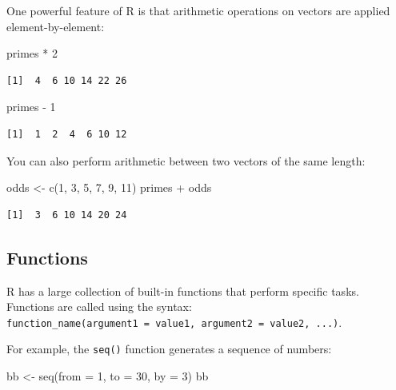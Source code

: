 \documentclass[
  letterpaper,
  DIV=11,
  numbers=noendperiod]{scrreprt}
\newenvironment{Shaded}{\begin{snugshade}}{\end{snugshade}}
\newcommand{\AttributeTok}[1]{\textcolor[rgb]{0.40,0.45,0.13}{#1}}
\newcommand{\DecValTok}[1]{\textcolor[rgb]{0.68,0.00,0.00}{#1}}
\newcommand{\FunctionTok}[1]{\textcolor[rgb]{0.28,0.35,0.67}{#1}}
\newcommand{\NormalTok}[1]{\textcolor[rgb]{0.00,0.23,0.31}{#1}}
\newcommand{\OtherTok}[1]{\textcolor[rgb]{0.00,0.23,0.31}{#1}}
\newcommand{\SpecialCharTok}[1]{\textcolor[rgb]{0.37,0.37,0.37}{#1}}
\begin{document}
One powerful feature of R is that arithmetic operations on vectors are
applied element-by-element:

\begin{Shaded}
\begin{Highlighting}[]
\NormalTok{primes }\SpecialCharTok{*} \DecValTok{2}
\end{Highlighting}
\end{Shaded}

\begin{verbatim}
[1]  4  6 10 14 22 26
\end{verbatim}

\begin{Shaded}
\begin{Highlighting}[]
\NormalTok{primes }\SpecialCharTok{{-}} \DecValTok{1}
\end{Highlighting}
\end{Shaded}

\begin{verbatim}
[1]  1  2  4  6 10 12
\end{verbatim}

You can also perform arithmetic between two vectors of the same length:

\begin{Shaded}
\begin{Highlighting}[]
\NormalTok{odds }\OtherTok{\textless{}{-}} \FunctionTok{c}\NormalTok{(}\DecValTok{1}\NormalTok{, }\DecValTok{3}\NormalTok{, }\DecValTok{5}\NormalTok{, }\DecValTok{7}\NormalTok{, }\DecValTok{9}\NormalTok{, }\DecValTok{11}\NormalTok{)}
\NormalTok{primes }\SpecialCharTok{+}\NormalTok{ odds}
\end{Highlighting}
\end{Shaded}

\begin{verbatim}
[1]  3  6 10 14 20 24
\end{verbatim}

\subsection{Functions}\label{functions}

R has a large collection of built-in functions that perform specific
tasks. Functions are called using the syntax:
\texttt{function\_name(argument1\ =\ value1,\ argument2\ =\ value2,\ ...)}.

For example, the \texttt{seq()} function generates a sequence of
numbers:

\begin{Shaded}
\begin{Highlighting}[]
\NormalTok{bb }\OtherTok{\textless{}{-}} \FunctionTok{seq}\NormalTok{(}\AttributeTok{from =} \DecValTok{1}\NormalTok{, }\AttributeTok{to =} \DecValTok{30}\NormalTok{, }\AttributeTok{by =} \DecValTok{3}\NormalTok{)}
\NormalTok{bb}
\end{Highlighting}
\end{Shaded}
\end{document}

